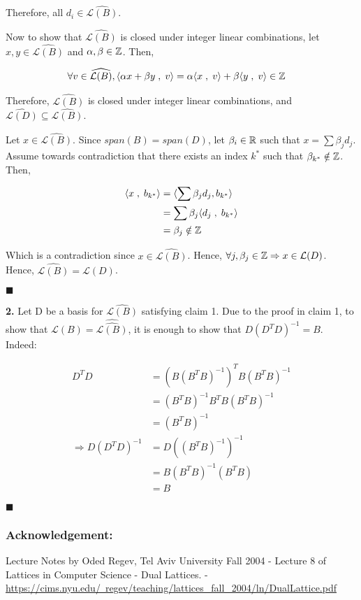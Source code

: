Therefore, all $d_i \in \widehat{{\mathcal{L}(B)}}$.

Now to show that $\widehat{{\mathcal{L}(B)}}$ is closed under integer linear combinations, let $x, y \in \widehat{{\mathcal{L}(B)}}$ and $\alpha, \beta \in \mathbb{Z}$. Then,

\begin{align*}
    \forall v \in \widehat{{\mathcal{L}(B)}}, \langle \alpha x + \beta y \;, \; v \rangle &= \alpha \langle x\;, \; v \rangle + \beta \langle y \;, \; v \rangle \in \mathbb{Z}
\end{align*}

Therefore, $\widehat{{\mathcal{L}(B)}}$ is closed under integer linear combinations, and $\widehat{{\mathcal{L}(D)}} \subseteq \widehat{{\mathcal{L}(B)}}$.

Let $x \in \widehat{{\mathcal{L}(B)}}$. Since $span(B) = span(D)$, let $\beta_i \in \mathbb{R}$ such that $x = \sum \beta_j d_j$. Assume towards contradiction that there exists an index $k^*$ such that $\beta_{k^*} \notin \mathbb{Z}$. Then,

\begin{align*}
    \langle x \;, \; b_{k^*} \rangle &= \langle \sum \beta_j d_j, b_{k^*} \rangle \\
    &= \sum \beta_j \langle d_j \;, \; b_{k^*} \rangle \\
    &= \beta_j \notin \mathbb{Z}
\end{align*}

Which is a contradiction since $x \in \widehat{{\mathcal{L}(B)}}$. Hence, $\forall j, \beta_j \in \mathbb{Z} \Rightarrow x \in {\mathcal{L}(D)}$. Hence, $\widehat{{\mathcal{L}(B)}} = \mathcal{L}(D)$.

\hfill $\blacksquare$

\textbf{2. } Let D be a basis for $\widehat{\mathcal{L}(B)}$ satisfying claim 1. Due to the proof in claim 1, to show that $\mathcal{L}(B) = \widehat{\widehat{\mathcal{L}(B)}}$, it is enough to show that $D (D^TD)^{-1} = B$. Indeed:

\begin{align*}
    D^TD &= \left(B (B^TB)^{-1}\right)^T B(B^TB)^{-1} \\
    &= (B^TB)^{-1} B^T B (B^TB)^{-1} \\
    &= (B^TB)^{-1} \\
    \Rightarrow D (D^TD)^{-1} &= D \left((B^TB)^{-1}\right)^{-1} \\
    &= B (B^TB)^{-1} (B^TB) \\
    &= B
\end{align*}

\hfill $\blacksquare$

\subsubsection*{Acknowledgement: }
Lecture Notes by Oded Regev, Tel Aviv University Fall 2004 - Lecture 8 of Lattices in Computer Science - Dual Lattices. -  \href{https://cims.nyu.edu/~regev/teaching/lattices\_fall\_2004/ln/DualLattice.pdf}{https://cims.nyu.edu/~regev/teaching/lattices\_fall\_2004/ln/DualLattice.pdf}